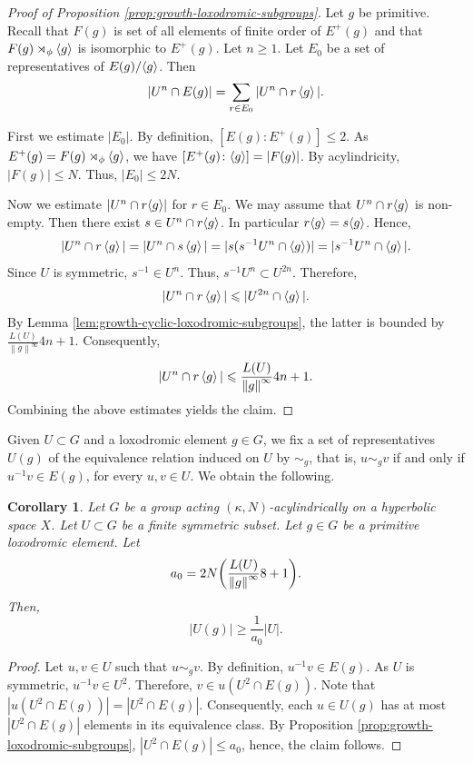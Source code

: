 \documentclass[leqno,a4paper,10pt]{amsart}
\theoremstyle{plain}
\newtheorem{cor}[thm]{Corollary}
\theoremstyle{definition}
\theoremstyle{remark}
\let\le\leqslant
\let\ge\geqslant
\newcommand{\group}[1]{
	\mathchoice%
	{\left\langle #1\right\rangle}%
	{\langle #1\rangle}%
	{\langle #1\rangle}%
	{\langle #1\rangle}%
}
\newcommand{\sdirect}[3]{%
	#1 \rtimes_{#2} #3
}
\newcommand{\stlen}[1]{
	\left\| #1\right\|^{\infty}
}
\begin{document}
\begin{proof}[Proof of Proposition \ref{prop:growth-loxodromic-subgroups}] Let $g$ be primitive. 	
	 Recall that $F(g)$ is set of all elements of finite order of $E^+(g)$ and that $\sdirect{F(g)}{\phi}{\group{g}}$ is isomorphic to $ E^+(g)$.  
	  Let $n \ge 1$. Let $E_0$ be a set of representatives of $E(g)/\group{g}$. Then 
	$$|U^n\cap E(g)|=\sum_{r\in E_0} |U^n\cap r\group{g}|.$$
	
	First we estimate $|E_0|$. By definition, $[E(g)\colon E^+(g)]\le 2$. As $E^+(g)=\sdirect{F(g)}{\phi}{\group{g}}$, we have $[E^+(g)\colon \group{g}]=|F(g)|$. By acylindricity, $|F(g)|\le N$.   Thus,  
	$|E_0|\le 2N.$
	
	Now we estimate $|U^n\cap r\group{g}|$ for $r\in E_0$. We may assume that $U^n\cap r\group{g}$ is non-empty. Then there exist $s\in U^n\cap r\group{g}$. In particular $r\group{g}=s\group{g}$. Hence,
	$$|U^n\cap r\group{g}|=|U^n\cap s\group{g}|=|s(s^{-1}U^n\cap \group{g})|=|s^{-1}U^n\cap \group{g}|.$$
	Since $U$ is symmetric, $s^{-1}\in U^n$. Thus,  $s^{-1}U^n\subset U^{2n}$. Therefore,
	$$|U^n\cap r\group{g}|\le |U^{2n}\cap \group{g}|.$$
	By Lemma \ref{lem:growth-cyclic-loxodromic-subgroups}, the latter is bounded by 
	$ \frac{L(U)}{\stlen{g}}4n+1.$
	Consequently,
	$$|U^n\cap r\group{g}|\le \frac{L(U)}{\stlen{g}}4n+1.$$
		Combining the above estimates yields the claim. 
\end{proof}

Given $U\subset G$ and a loxodromic element $g\in G$, we fix a set of representatives $U(g)$ of the equivalence relation induced on $U$ by $\sim_g$, that is, $u\sim_g v$ if and only if $u^{-1}v\in E(g)$, for every $u,v\in U$.  
  We obtain the following.

\begin{cor}
	
	\label{cor:growth-loxodromic-subgroups}
	Let $G$ be a group acting $(\kappa,N)$-acylindrically on a hyperbolic space $X$. Let $U\subset G$ be a finite symmetric subset. Let $g\in G$ be a primitive loxodromic element. Let
	$$a_0=2N\qty(\frac{L(U)}{\stlen{g}}8+1).$$
	Then,
	$$|U(g)|\ge \frac{1}{a_0}|U|.$$
	
\end{cor}

\begin{proof}
	
Let $u,v\in U$ such that $u \sim_g v$. By definition, $u^{-1}v\in E(g)$. As $U$ is symmetric, $u^{-1}v\in U^2$. Therefore, $v\in u(U^2\cap E(g))$. Note that $|u(U^2\cap E(g))|=|U^2\cap E(g)|$. Consequently, each $u\in U(g)$ has at most $|U^2\cap E(g)|$ elements in its equivalence class. By Proposition \ref{prop:growth-loxodromic-subgroups}, $|U^2\cap E(g)|\le a_0$, hence, the claim follows.	
\end{proof}
\end{document}
